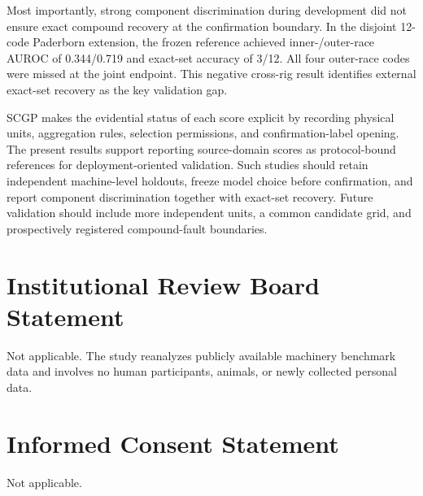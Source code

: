 \documentclass[machines,article,submit,oneauthor,pdftex]{Definitions/mdpi}
\begin{document}
Most importantly, strong component discrimination during development did not ensure exact compound recovery at the confirmation boundary. In the disjoint 12-code Paderborn extension, the frozen reference achieved inner-/outer-race AUROC of 0.344/0.719 and exact-set accuracy of 3/12. All four outer-race codes were missed at the joint endpoint. This negative cross-rig result identifies external exact-set recovery as the key validation gap.

SCGP makes the evidential status of each score explicit by recording physical units, aggregation rules, selection permissions, and confirmation-label opening. The present results support reporting source-domain scores as protocol-bound references for deployment-oriented validation. Such studies should retain independent machine-level holdouts, freeze model choice before confirmation, and report component discrimination together with exact-set recovery. Future validation should include more independent units, a common candidate grid, and prospectively registered compound-fault boundaries.



\section*{Institutional Review Board Statement}
Not applicable. The study reanalyzes publicly available machinery benchmark data and involves no human participants, animals, or newly collected personal data.

\section*{Informed Consent Statement}
Not applicable.
\end{document}

